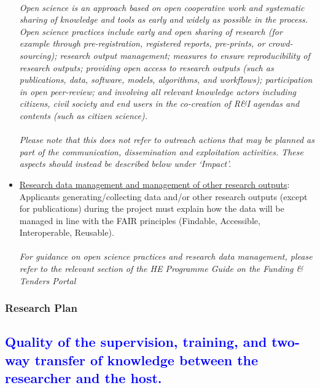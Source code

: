 \documentclass[11pt,a4paper]{article}
\begin{document}
\begin{itemize}
    \\
    \textit{Open science is an approach based on open cooperative work and systematic sharing of knowledge and tools as early and widely as possible in the process. Open science practices include early and open sharing of research (for example through pre-registration, registered reports, pre-prints, or crowd-sourcing); research output management; measures to ensure reproducibility of research outputs; providing open access to research outputs (such as publications, data, software, models, algorithms, and workflows); participation in open peer-review; and involving all relevant knowledge actors including citizens, civil society and end users in the co-creation of R\&I agendas and contents (such as citizen science).}\\
    \\
    \textit{Please note that this does not refer to outreach actions that may be planned as part of the communication, dissemination and exploitation activities. These aspects should instead be described below under ‘Impact’.}
    \item\underline{Research data management and management of other research outputs}: Applicants generating/collecting data and/or other research outputs (except for publications) during the project must explain how the data will be managed in line with the FAIR principles (Findable, Accessible, Interoperable, Reusable).\\
    \\
    \textit{For guidance on open science practices and research data management, please refer to the relevant section of the HE Programme Guide on the Funding \& Tenders Portal}
\end{itemize}
\color{black}




\newpage

\subsubsection{Research Plan}\label{sec:ResPlan}



\textcolor{Blue}{\subsection{Quality of the supervision, training, and two-way transfer of knowledge between the researcher and the host.}}
\end{document}
